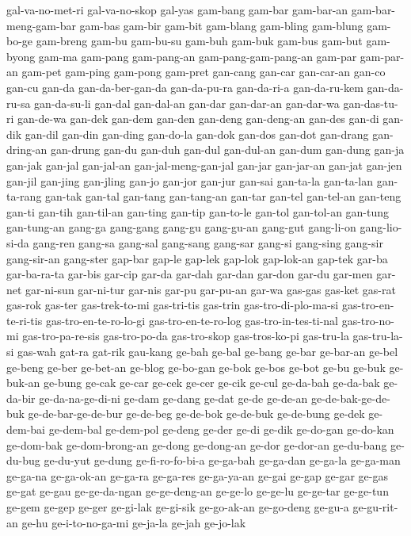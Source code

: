 {gal-va-no-met-ri gal-va-no-skop gal-yas gam-bang gam-bar gam-bar-an
gam-bar-meng-gam-bar gam-bas gam-bir gam-bit gam-blang gam-bling gam-blung
gam-bo-ge gam-breng gam-bu gam-bu-su gam-buh gam-buk gam-bus gam-but
gam-byong gam-ma gam-pang gam-pang-an gam-pang-gam-pang-an gam-par
gam-par-an gam-pet gam-ping gam-pong gam-pret gan-cang gan-car gan-car-an
gan-co gan-cu gan-da gan-da-ber-gan-da gan-da-pu-ra gan-da-ri-a
gan-da-ru-kem gan-da-ru-sa gan-da-su-li gan-dal gan-dal-an gan-dar
gan-dar-an gan-dar-wa gan-das-tu-ri gan-de-wa gan-dek gan-dem gan-den
gan-deng gan-deng-an gan-des gan-di gan-dik gan-dil gan-din gan-ding
gan-do-la gan-dok gan-dos gan-dot gan-drang gan-dring-an gan-drung gan-du
gan-duh gan-dul gan-dul-an gan-dum gan-dung gan-ja gan-jak gan-jal
gan-jal-an gan-jal-meng-gan-jal gan-jar gan-jar-an gan-jat gan-jen gan-jil
gan-jing gan-jling gan-jo gan-jor gan-jur gan-sai gan-ta-la gan-ta-lan
gan-ta-rang gan-tak gan-tal gan-tang gan-tang-an gan-tar gan-tel
gan-tel-an gan-teng gan-ti gan-tih gan-til-an gan-ting gan-tip gan-to-le
gan-tol gan-tol-an gan-tung gan-tung-an gang-ga gang-gang gang-gu
gang-gu-an gang-gut gang-li-on gang-lio-si-da gang-ren gang-sa gang-sal
gang-sang gang-sar gang-si gang-sing gang-sir gang-sir-an gang-ster
gap-bar gap-le gap-lek gap-lok gap-lok-an gap-tek gar-ba gar-ba-ra-ta
gar-bis gar-cip gar-da gar-dah gar-dan gar-don gar-du gar-men gar-net
gar-ni-sun gar-ni-tur gar-nis gar-pu gar-pu-an gar-wa gas-gas gas-ket
gas-rat gas-rok gas-ter gas-trek-to-mi gas-tri-tis gas-trin
gas-tro-di-plo-ma-si gas-tro-en-te-ri-tis gas-tro-en-te-ro-lo-gi
gas-tro-en-te-ro-log gas-tro-in-tes-ti-nal gas-tro-no-mi gas-tro-pa-re-sis
gas-tro-po-da gas-tro-skop gas-tros-ko-pi gas-tru-la gas-tru-la-si gas-wah
gat-ra gat-rik gau-kang ge-bah ge-bal ge-bang ge-bar ge-bar-an ge-bel
ge-beng ge-ber ge-bet-an ge-blog ge-bo-gan ge-bok ge-bos ge-bot ge-bu
ge-buk ge-buk-an ge-bung ge-cak ge-car ge-cek ge-cer ge-cik ge-cul
ge-da-bah ge-da-bak ge-da-bir ge-da-na-ge-di-ni ge-dam ge-dang ge-dat
ge-de ge-de-an ge-de-bak-ge-de-buk ge-de-bar-ge-de-bur ge-de-beg ge-de-bok
ge-de-buk ge-de-bung ge-dek ge-dem-bai ge-dem-bal ge-dem-pol ge-deng
ge-der ge-di ge-dik ge-do-gan ge-do-kan ge-dom-bak ge-dom-brong-an ge-dong
ge-dong-an ge-dor ge-dor-an ge-du-bang ge-du-bug ge-du-yut ge-dung
ge-fi-ro-fo-bi-a ge-ga-bah ge-ga-dan ge-ga-la ge-ga-man ge-ga-na
ge-ga-ok-an ge-ga-ra ge-ga-res ge-ga-ya-an ge-gai ge-gap ge-gar ge-gas
ge-gat ge-gau ge-ge-da-ngan ge-ge-deng-an ge-ge-lo ge-ge-lu ge-ge-tar
ge-ge-tun ge-gem ge-gep ge-ger ge-gi-lak ge-gi-sik ge-go-ak-an ge-go-deng
ge-gu-a ge-gu-rit-an ge-hu ge-i-to-no-ga-mi ge-ja-la ge-jah ge-jo-lak
}
